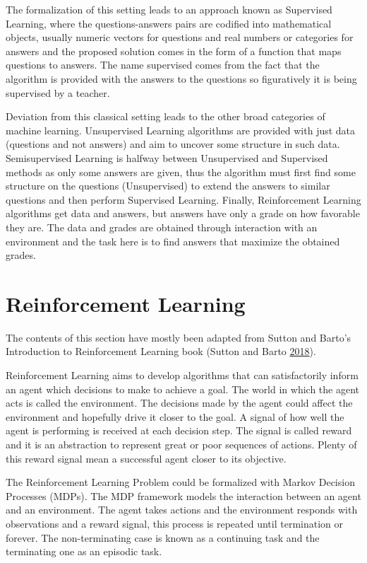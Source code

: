 \documentclass[
  12pt,
  openany]{book}
\begin{document}
The formalization of this setting leads to an approach known as Supervised Learning, where the questions-answers pairs are codified into mathematical objects, usually numeric vectors for questions and real numbers or categories for answers and the proposed solution comes in the form of a function that maps questions to answers. The name supervised comes from the fact that the algorithm is provided with the answers to the questions so figuratively it is being supervised by a teacher.

Deviation from this classical setting leads to the other broad categories of machine learning. Unsupervised Learning algorithms are provided with just data (questions and not answers) and aim to uncover some structure in such data. Semisupervised Learning is halfway between Unsupervised and Supervised methods as only some answers are given, thus the algorithm must first find some structure on the questions (Unsupervised) to extend the answers to similar questions and then perform Supervised Learning. Finally, Reinforcement Learning algorithms get data and answers, but answers have only a grade on how favorable they are. The data and grades are obtained through interaction with an environment and the task here is to find answers that maximize the obtained grades.

\hypertarget{reinforcement-learning-1}{%
\section{Reinforcement Learning}\label{reinforcement-learning-1}}

The contents of this section have mostly been adapted from Sutton and Barto's Introduction to Reinforcement Learning book (Sutton and Barto \protect\hyperlink{ref-sutton2018reinforcement}{2018}).

Reinforcement Learning aims to develop algorithms that can satisfactorily inform an agent which decisions to make to achieve a goal. The world in which the agent acts is called the environment. The decisions made by the agent could affect the environment and hopefully drive it closer to the goal. A signal of how well the agent is performing is received at each decision step. The signal is called reward and it is an abstraction to represent great or poor sequences of actions. Plenty of this reward signal mean a successful agent closer to its objective.

The Reinforcement Learning Problem could be formalized with Markov Decision Processes (MDPs). The MDP framework models the interaction between an agent and an environment. The agent takes actions and the environment responds with observations and a reward signal, this process is repeated until termination or forever. The non-terminating case is known as a continuing task and the terminating one as an episodic task.
\end{document}

